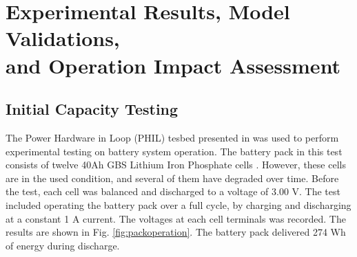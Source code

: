 \documentclass[10pt,twocolumn]{IEEEtran}
\begin{document}
%
\section{Experimental Results, Model Validations,\\ and Operation Impact Assessment} \label{sec:results}


\subsection{Initial Capacity Testing} \label{sec:capacity_test_1}

The Power Hardware in Loop (PHIL) tesbed presented in \cite{PHIL} was used to perform experimental testing on battery system operation. The battery pack in this test consists of twelve  40Ah GBS Lithium Iron Phosphate cells \cite{elitepower}. However, these cells are in the used condition, and several of them have degraded over time.  Before the test, each cell was balanced and discharged to a voltage of 3.00 V.  The test included operating the battery pack over a full cycle, by charging and discharging at a constant 1 A current.  %
The voltages  at each cell terminals  was  recorded. %
The results are shown in Fig.  \ref{fig:packoperation}.
The battery pack delivered 274 Wh of energy during discharge.
\end{document}
